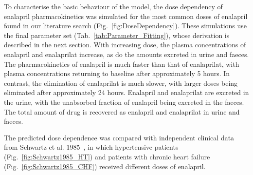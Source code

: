 To characterise the basic behaviour of the model, the dose dependency of enalapril pharmacokinetics was simulated for the most common doses of enalapril found in our literature search (Fig.~\ref{fig:DoseDependency}). These simulations use the final parameter set (Tab.~\ref{tab:Parameter_Fitting}), whose derivation is described in the next section. With increasing dose, the plasma concentrations of enalapril and enalaprilat increase, as do the amounts excreted in urine and faeces. The pharmacokinetics of enalapril is much faster than that of enalaprilat, with plasma concentrations returning to baseline after approximately 5 hours. In contrast, the elimination of enalaprilat is much slower, with larger doses being eliminated after approximately 24 hours. Enalapril and enalaprilat are excreted in the urine, with the unabsorbed fraction of enalapril being excreted in the faeces. The total amount of drug is recovered as enalapril and enalaprilat in urine and faeces.


The predicted dose dependence was compared with independent clinical data from Schwartz et al. 1985~\cite{Schwartz1985}, in which hypertensive patients (Fig.~\ref{fig:Schwartz1985_HT}) and patients with chronic heart failure (Fig.~\ref{fig:Schwartz1985_CHF}) received different doses of enalapril.





